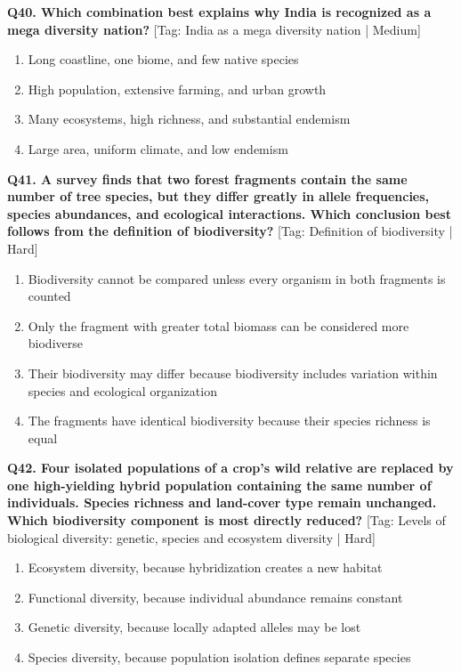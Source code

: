 \noindent\textbf{Q40. Which combination best explains why India is recognized as a mega diversity nation?} \hfill [Tag: India as a mega diversity nation | Medium]
\begin{enumerate}[label=(\alph*),topsep=2pt,itemsep=1pt,partopsep=0pt,parsep=0pt]
    \item {Long coastline, one biome, and few native species}
    \item {High population, extensive farming, and urban growth}
    \item {Many ecosystems, high richness, and substantial endemism}
    \item {Large area, uniform climate, and low endemism}
\end{enumerate}
\vspace{2mm}

\noindent\textbf{Q41. A survey finds that two forest fragments contain the same number of tree species, but they differ greatly in allele frequencies, species abundances, and ecological interactions. Which conclusion best follows from the definition of biodiversity?} \hfill [Tag: Definition of biodiversity | Hard]
\begin{enumerate}[label=(\alph*),topsep=2pt,itemsep=1pt,partopsep=0pt,parsep=0pt]
    \item {Biodiversity cannot be compared unless every organism in both fragments is counted}
    \item {Only the fragment with greater total biomass can be considered more biodiverse}
    \item {Their biodiversity may differ because biodiversity includes variation within species and ecological organization}
    \item {The fragments have identical biodiversity because their species richness is equal}
\end{enumerate}
\vspace{2mm}

\noindent\textbf{Q42. Four isolated populations of a crop's wild relative are replaced by one high-yielding hybrid population containing the same number of individuals. Species richness and land-cover type remain unchanged. Which biodiversity component is most directly reduced?} \hfill [Tag: Levels of biological diversity: genetic, species and ecosystem diversity | Hard]
\begin{enumerate}[label=(\alph*),topsep=2pt,itemsep=1pt,partopsep=0pt,parsep=0pt]
    \item {Ecosystem diversity, because hybridization creates a new habitat}
    \item {Functional diversity, because individual abundance remains constant}
    \item {Genetic diversity, because locally adapted alleles may be lost}
    \item {Species diversity, because population isolation defines separate species}
\end{enumerate}
\vspace{2mm}

